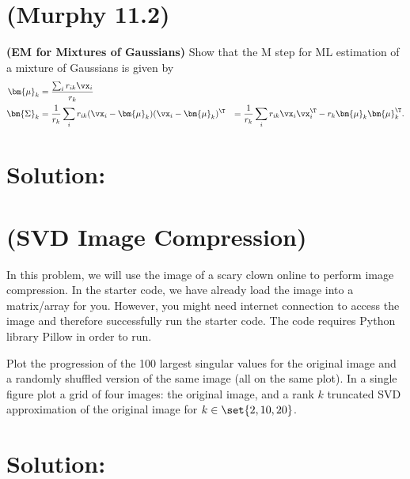 \documentclass[189]{pset}
\begin{document}

  \section{(Murphy 11.2)}
    \textbf{(EM for Mixtures of Gaussians)} Show that the M step for
    ML estimation of a mixture of Gaussians is given by
    \begin{align*}
      \bm{\mu}_k
      &= \frac{\sum_i r_{ik}\vx_i}{r_k} \\
      \bm{\Sigma}_k
      &= \frac{1}{r_k}\sum_i r_{ik}(\vx_i - \bm{\mu}_k)(\vx_i -
        \bm{\mu}_k)^\T
      &= \frac{1}{r_k} \sum_i r_{ik}\vx_i\vx_i^\T - r_k\bm{\mu}_k
        \bm{\mu}_k^\T.
    \end{align*}

  \hrulefill

  \section*{Solution:}

  \clearpage


  \section{(SVD Image Compression)}
    In this problem, we will use the image of a scary clown online to
    perform image compression.  In the starter code, we have already
    load the image into a matrix/array for you. However, you might
    need internet connection to access the image and therefore
    successfully run the starter code. The code requires Python
    library Pillow in order to run.

    Plot the progression of the 100 largest singular values for the
    original image and a randomly shuffled version of the same image
    (all on the same plot). In a single figure plot a grid of four
    images: the original image, and a rank $k$ truncated SVD
    approximation of the original image for $k \in \set{2,10,20}$.

  \hrulefill

  \section*{Solution:}
\end{document}
